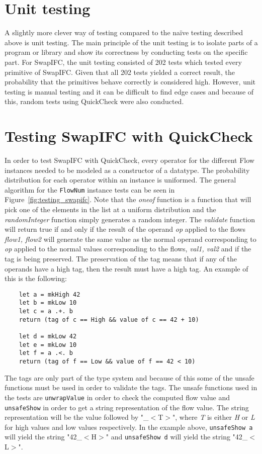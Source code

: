 \section{Unit testing}
A slightly more clever way of testing compared to the naïve testing described above is unit testing. The main principle of the unit testing is to isolate parts of a program or library and show its correctness by conducting tests on the specific part. For SwapIFC, the unit testing consisted of 202 tests which tested every primitive of SwapIFC. Given that all 202 tests yielded a correct result, the probability that the primitives behave correctly is considered high. However, unit testing is manual testing and it can be difficult to find edge cases and because of this, random tests using QuickCheck were also conducted.

\section{Testing SwapIFC with QuickCheck}
In order to test SwapIFC with QuickCheck, every operator for the different Flow instances needed to be modeled as a constructor of a datatype. The probability distribution for each operator within an instance is uniformed. The general algorithm for the {\tt FlowNum} instance tests can be seen in Figure~\ref{fig:testing_swapifc}. Note that the \emph{oneof} function is a function that will pick one of the elements in the list at a uniform distribution and the \emph{randomInteger} function simply generates a random integer. The \emph{validate} function will return true if and only if the result of the operand \emph{op} applied to the flows \emph{flow1, flow2} will generate the same value as the normal operand corresponding to \emph{op} applied to the normal values corresponding to the flows, \emph{val1, val2} and if the tag is being preserved. The preservation of the tag means that if any of the operands have a high tag, then the result must have a high tag. An example of this is the following:
\begin{verbatim}
    let a = mkHigh 42
    let b = mkLow 10
    let c = a .+. b
    return (tag of c == High && value of c == 42 + 10)

    let d = mkLow 42
    let e = mkLow 10
    let f = a .<. b
    return (tag of f == Low && value of f == 42 < 10)
\end{verbatim}

The tags are only part of the type system and because of this some of the unsafe functions must be used in order to validate the tags. The unsafe functions used in the tests are {\tt unwrapValue} in order to check the computed flow value and {\tt unsafeShow} in order to get a string representation of the flow value. The string representation will be the value followed by "\_$<$T$>$", where \emph{T} is either \emph{H} or \emph{L} for high values and low values respectively. In the example above, {\tt unsafeShow a} will yield the string "42\_$<$H$>$" and {\tt unsafeShow d} will yield the string "42\_$<$L$>$".

